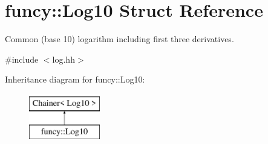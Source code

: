 \hypertarget{structfuncy_1_1Log10}{\section{funcy\-:\-:Log10 Struct Reference}
\label{structfuncy_1_1Log10}
}


Common (base 10) logarithm including first three derivatives.  




{\ttfamily \#include $<$log.\-hh$>$}

Inheritance diagram for funcy\-:\-:Log10\-:\begin{figure}[H]
\begin{center}
\leavevmode
\includegraphics[height=2.000000cm]{structfuncy_1_1Log10}
\end{center}
\end{figure}
